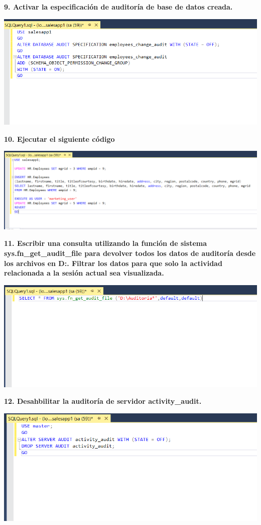 \documentclass{article}
\begin{document}
\newpage
\textbf{9. Activar la especificación de auditoría de base de datos creada.}

    \begin{center}
		\includegraphics[width=15cm]{./images/13} 
	\end{center}

\textbf{10. Ejecutar el siguiente código}

    \begin{center}
		\includegraphics[width=15cm]{./images/14} 
	\end{center}


\newpage
\textbf{11.  Escribir una consulta utilizando la función de sistema sys.fn_get_audit_file para devolver todos los datos de auditoría desde los archivos en D:\Auditoria. Filtrar los datos para que solo la actividad relacionada a la sesión actual sea visualizada.}

    \begin{center}
		\includegraphics[width=15cm]{./images/15} 
	\end{center}

\textbf{12.  Desahbilitar la auditoría de servidor activity_audit.}

    \begin{center}
		\includegraphics[width=15cm]{./images/16} 
	\end{center}
   
\end{document}
